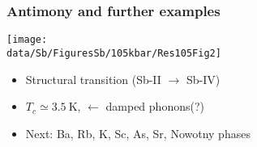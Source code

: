 \begin{frame}[label=SbRes]
\frametitle{Antimony and further examples}
    
    
\centerline{\texttt{[image: \\data/Sb/FiguresSb/105kbar/Res105Fig2]}}
    
    
\begin{itemize}
    \item Structural transition (Sb-II $\rightarrow$ Sb-IV)
    \item $T_c \simeq 3.5 ~ \text{K}$,   $\leftarrow$ damped phonons(?)
    \item Next: Ba, Rb, K, Sc, As, Sr, Nowotny phases
    
\end{itemize}
\end{frame}


